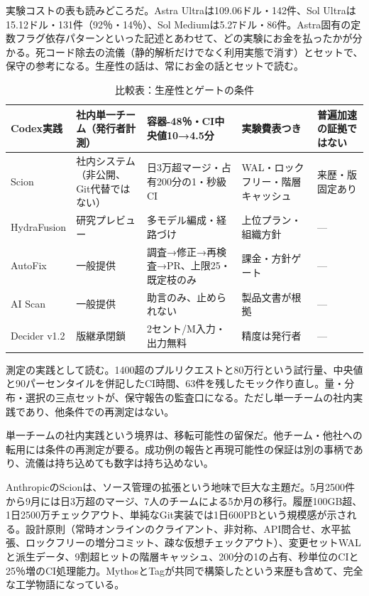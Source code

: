 \documentclass[lualatex,a4paper,10pt]{jlreq}
\begin{document}
実験コストの表も読みどころだ。Astra Ultraは109.06ドル・142件、Sol Ultraは15.12ドル・131件（92％・14％）、Sol Mediumは5.27ドル・86件。Astra固有の定数フラグ依存パターンといった記述とあわせて、どの実験にお金を払ったかが分かる。死コード除去の流儀（静的解析だけでなく利用実態で消す）とセットで、保守の参考になる。生産性の話は、常にお金の話とセットで読む。
\cite{B31}


\begin{table}[htbp]\centering\footnotesize
\caption{比較表：生産性とゲートの条件}
\begin{tabularx}{0.96\linewidth}{@{}lXXXX@{}}
\toprule
Codex実践 & 社内単一チーム（発行者計測） & 容器-48％・CI中央値10→4.5分 & 実験費表つき & 普遍加速の証拠ではない \cite{B31} \\
\midrule
Scion & 社内システム（非公開、Git代替ではない） & 日3万超マージ・占有200分の1・秒級CI & WAL・ロックフリー・階層キャッシュ & 来歴・版固定あり \cite{B32} \\
\midrule
HydraFusion & 研究プレビュー & 多モデル編成・経路づけ & 上位プラン・組織方針 & --- \cite{B33} \\
\midrule
AutoFix & 一般提供 & 調査→修正→再検査→PR、上限25・既定枝のみ & 課金・方針ゲート & --- \cite{B34} \\
\midrule
AI Scan & 一般提供 & 助言のみ、止められない & 製品文書が根拠 & --- \cite{B35} \\
\midrule
Decider v1.2 & 版継承閉鎖 & 2セント/M入力・出力無料 & 精度は発行者 & --- \cite{B37,B36,B38} \\
\bottomrule
\end{tabularx}
\end{table}

測定の実践として読む。1400超のプルリクエストと80万行という試行量、中央値と90パーセンタイルを併記したCI時間、63件を残したモック作り直し。量・分布・選択の三点セットが、保守報告の監査口になる。ただし単一チームの社内実践であり、他条件での再測定はない。
\cite{B31}


単一チームの社内実践という境界は、移転可能性の留保だ。他チーム・他社への転用には条件の再測定が要る。成功例の報告と再現可能性の保証は別の事柄であり、流儀は持ち込めても数字は持ち込めない。
\cite{B31}


AnthropicのScionは、ソース管理の拡張という地味で巨大な主題だ。5月2500件から9月には日3万超のマージ、7人のチームによる5か月の移行。履歴100GB超、1日2500万チェックアウト、単純なGit実装では1日600PBという規模感が示される。設計原則（常時オンラインのクライアント、非対称、API問合せ、水平拡張、ロックフリーの増分コミット、疎な仮想チェックアウト）、変更セットWALと派生データ、9割超ヒットの階層キャッシュ、200分の1の占有、秒単位のCIと25％増のCI処理能力。MythosとTagが共同で構築したという来歴も含めて、完全な工学物語になっている。
\cite{B32}
\end{document}
